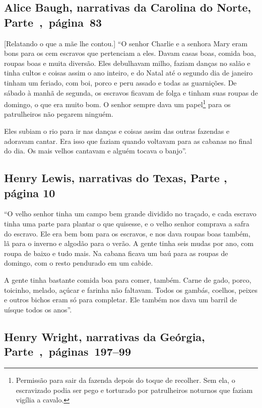 \subsection{Alice Baugh, narrativas da Carolina do Norte, Parte~,~página~83}

{[}Relatando o que a mãe lhe contou.{]} ``O senhor Charlie e a senhora Mary eram bons para os cem escravos que pertenciam a eles. Davam casas boas, comida boa, roupas boas e muita
diversão. Eles debulhavam milho, faziam danças no salão e tinha cultos e
coisas assim o ano inteiro, e do Natal até o segundo dia de janeiro
tinham um feriado, com boi, porco e peru assado e todas as guarnições.
De sábado à manhã de segunda, os escravos ficavam de folga e tinham suas
roupas de domingo, o que era muito bom. O senhor sempre dava um papel\footnote{Permissão para sair
da fazenda depois do toque de recolher. Sem ela, o escravizado podia ser
pego e torturado por patrulheiros noturnos que faziam vigília a
cavalo.} para os patrulheiros não pegarem ninguém.

Eles subiam o rio para ir nas danças e coisas assim das outras fazendas
e adoravam cantar. Era isso que faziam quando voltavam para as cabanas
no final do dia. Os mais velhos cantavam e alguém tocava o banjo''.

\subsection{Henry Lewis, narrativas do Texas, Parte , página 10}
\label{ref176}

``O velho senhor tinha um campo bem grande dividido no traçado, e cada
escravo tinha uma parte para plantar o que quisesse, e o velho senhor
comprava a safra do escravo. Ele era bem bom para os escravos, e nos
dava roupas boas também, lã para o inverno e algodão para o verão. A
gente tinha seis mudas por ano, com roupa de baixo e tudo mais. Na
cabana ficava um baú para as roupas de domingo, com o resto pendurado em
um cabide.

A gente tinha bastante comida boa para comer, também. Carne de gado,
porco, toicinho, melado, açúcar e farinha não faltavam. Todos os gambás,
coelhos, peixes e outros bichos eram só para completar. Ele também nos
dava um barril de uísque todos os anos''.

\subsection{Henry Wright, narrativas da Geórgia, Parte~,~páginas~197--99}
\label{ref317}


